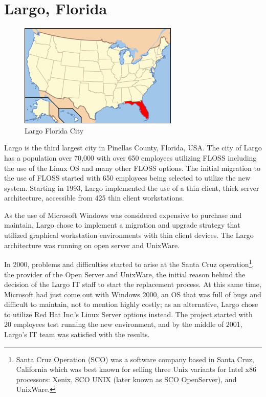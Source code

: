 \section {Largo, Florida}
\label{largo}
\begin{figure}[H]
\centering
    \includegraphics[scale=0.8]{img/Largo.png} 
  \caption{ Largo Florida City}
    \end{figure}
Largo is the third largest city in Pinellas County, Florida, USA.
The city of Largo has a population over 70,000 with over 650 employees utilizing FLOSS including the use of the Linux OS and many other FLOSS options. The initial migration to the use of FLOSS started with 650 employees being selected to utilize the new system. Starting in 1993, Largo implemented the use of a thin client, thick server architecture, accessible from 425 thin client workstations.

As the use of Microsoft Windows was considered expensive to purchase and maintain, Largo chose to implement a migration and upgrade strategy that utilized graphical workstation environments with thin client devices. The Largo architecture was running on open server and UnixWare. 

In 2000, problems and difficulties started to arise at the Santa Cruz operation\footnote{Santa Cruz Operation (SCO) was a software company based in Santa Cruz, California which was best known for selling three Unix variants for Intel x86 processors: Xenix, SCO UNIX (later known as SCO OpenServer), and UnixWare.}, the provider of the Open Server and UnixWare, the initial reason behind the decision of the Largo IT staff to start the replacement process. At this same time, Microsoft had just come out with Windows 2000, an OS that was full of bugs and difficult to maintain, not to mention highly costly; as an alternative, Largo chose to utilize Red Hat Inc.’s Linux Server options instead. The project started with 20 employees test running the new environment, and by the middle of 2001, Largo’s IT team was satisfied with the results.

